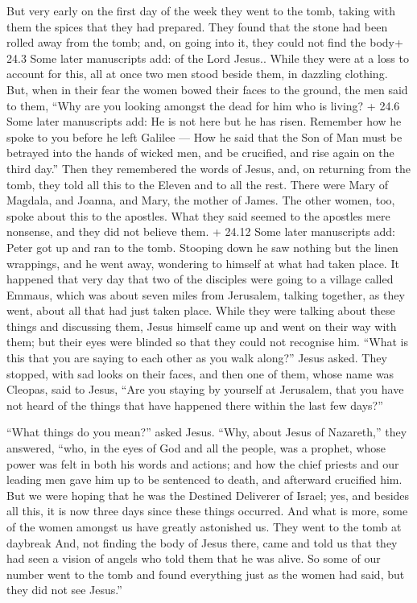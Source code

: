  But very early on the first day of the week they went to
the tomb, taking with them the spices that they had prepared.
 They found that the stone had been rolled away from the
tomb;  and, on going into it, they could not find the body+
24.3 Some later manuscripts add: of the Lord Jesus..  While
they were at a loss to account for this, all at once two men stood
beside them, in dazzling clothing.  But, when in their fear
the women bowed their faces to the ground, the men said to them, ``Why
are you looking amongst the dead for him who is living?  +
24.6 Some later manuscripts add: He is not here but he has risen.
Remember how he spoke to you before he left Galilee ---  How
he said that the Son of Man must be betrayed into the hands of wicked
men, and be crucified, and rise again on the third day.'' 
Then they remembered the words of Jesus,  and, on returning
from the tomb, they told all this to the Eleven and to all the rest.
 There were Mary of Magdala, and Joanna, and Mary, the
mother of James. The other women, too, spoke about this to the apostles.
 What they said seemed to the apostles mere nonsense, and
they did not believe them.  + 24.12 Some later manuscripts
add: Peter got up and ran to the tomb. Stooping down he saw nothing but
the linen wrappings, and he went away, wondering to himself at what had
taken place.  It happened that very day that two of the
disciples were going to a village called Emmaus, which was about seven
miles from Jerusalem,  talking together, as they went,
about all that had just taken place.  While they were
talking about these things and discussing them, Jesus himself came up
and went on their way with them;  but their eyes were
blinded so that they could not recognise him.  ``What is
this that you are saying to each other as you walk along?'' Jesus asked.
They stopped, with sad looks on their faces,  and then one
of them, whose name was Cleopas, said to Jesus, ``Are you staying by
yourself at Jerusalem, that you have not heard of the things that have
happened there within the last few days?''

 ``What things do you mean?'' asked Jesus. ``Why, about
Jesus of Nazareth,'' they answered, ``who, in the eyes of God and all
the people, was a prophet, whose power was felt in both his words and
actions;  and how the chief priests and our leading men
gave him up to be sentenced to death, and afterward crucified him.
 But we were hoping that he was the Destined Deliverer of
Israel; yes, and besides all this, it is now three days since these
things occurred.  And what is more, some of the women
amongst us have greatly astonished us. They went to the tomb at daybreak
 And, not finding the body of Jesus there, came and told us
that they had seen a vision of angels who told them that he was alive.
 So some of our number went to the tomb and found
everything just as the women had said, but they did not see Jesus.''

